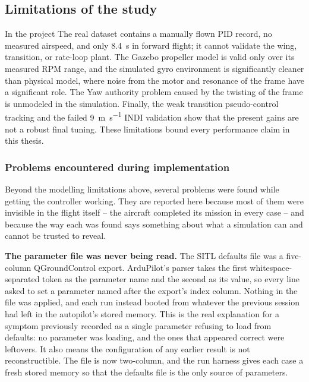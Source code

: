 \documentclass{article}
\begin{document}
\subsection{Limitations of the study}
\label{sec:limitations}
In the project 
The real dataset contains a manually flown PID record, no measured airspeed, and only \SI{8.4}{\second} in forward flight; it cannot validate the wing, transition, or rate-loop plant. The Gazebo propeller model is valid only over its measured RPM range, and the simulated gyro environment is significantly cleaner than physical model, where noise from the motor and resonance of the frame have a significant role. The Yaw authority problem caused by the twisting of the frame is unmodeled in the simulation. Finally, the weak transition pseudo-control tracking and the failed \SI{9}{\meter\per\second} INDI validation show that the present gains are not a robust final tuning. These limitations bound every performance claim in this thesis.


\subsubsection{Problems encountered during implementation}
\label{sec:filtering-problem}
Beyond the modelling limitations above, several problems were found while getting the controller working. They are reported here because most of them were invisible in the flight itself -- the aircraft completed its mission in every case -- and because the way each was found says something about what a simulation can and cannot be trusted to reveal.

\textbf{The parameter file was never being read.} The SITL defaults file was a five-column QGroundControl export. ArduPilot's parser takes the first whitespace-separated token as the parameter name and the second as its value, so every line asked to set a parameter named after the export's index column. Nothing in the file was applied, and each run instead booted from whatever the previous session had left in the autopilot's stored memory. This is the real explanation for a symptom previously recorded as a single parameter refusing to load from defaults: no parameter was loading, and the ones that appeared correct were leftovers. It also means the configuration of any earlier result is not reconstructible. The file is now two-column, and the run harness gives each case a fresh stored memory so that the defaults file is the only source of parameters.
\end{document}
